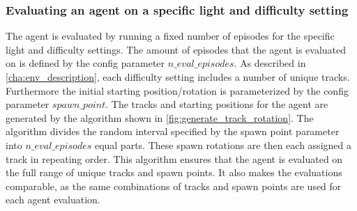 \begin{table}
\begin{center}
\end{center}
\caption{Collected and aggregate success\_rate metrics}
\label{table:success_rates_system}
\end{table}


\subsubsection{Evaluating an agent on a specific light and difficulty setting}

The agent is evaluated by running a fixed number of episodes for the specific light and difficulty settings. The amount of episodes that the agent is evaluated on is defined by the config parameter $n\_eval\_episodes$. As described in \ref{cha:env_description}, each difficulty setting includes a number of unique tracks. Furthermore the initial starting position/rotation is parameterized by the config parameter $spawn\_point$.
The tracks and starting positions for the agent are generated by the algorithm shown in \ref{fig:generate_track_rotation}. The algorithm divides the random interval specified by the spawn point parameter into $n\_eval\_episodes$ equal parts. These spawn rotations are then each assigned a track in repeating order.
This algorithm ensures that the agent is evaluated on the full range of unique tracks and spawn points.
It also makes the evaluations comparable, as the same combinations of tracks and spawn points are used for each agent evaluation.

